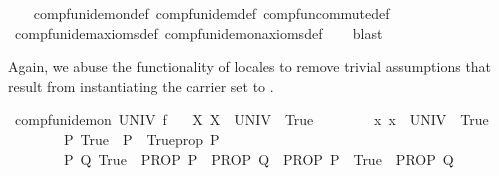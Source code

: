 \begin{isabellebody}
\isadelimproof
\ \ %
\endisadelimproof
%
\isatagproof
{}\isamarkupfalse%
\ comp{\isacharunderscore}{\kern0pt}fun{\isacharunderscore}{\kern0pt}idem{\isacharunderscore}{\kern0pt}on{\isacharunderscore}{\kern0pt}def\ comp{\isacharunderscore}{\kern0pt}fun{\isacharunderscore}{\kern0pt}idem{\isacharunderscore}{\kern0pt}def\ comp{\isacharunderscore}{\kern0pt}fun{\isacharunderscore}{\kern0pt}commute{\isacharunderscore}{\kern0pt}def{\isacharprime}{\kern0pt}\isanewline
\ \ \isamarkupfalse%
\ comp{\isacharunderscore}{\kern0pt}fun{\isacharunderscore}{\kern0pt}idem{\isacharunderscore}{\kern0pt}axioms{\isacharunderscore}{\kern0pt}def\ comp{\isacharunderscore}{\kern0pt}fun{\isacharunderscore}{\kern0pt}idem{\isacharunderscore}{\kern0pt}on{\isacharunderscore}{\kern0pt}axioms{\isacharunderscore}{\kern0pt}def\isanewline
\ \ \isamarkupfalse%
\ blast%
\endisatagproof
{\isafoldproof}%
%
\isadelimproof
%
\endisadelimproof
%
\begin{isamarkuptext}%
Again, we abuse the  functionality of locales to remove trivial assumptions that
  result from instantiating the carrier set to .%
\end{isamarkuptext}\isamarkuptrue%
\isamarkupfalse%
\ comp{\isacharunderscore}{\kern0pt}fun{\isacharunderscore}{\kern0pt}idem{\isacharunderscore}{\kern0pt}on\ UNIV\ f\isanewline
\ \ \ {\isachardoublequoteopen}{\isasymAnd}X{\isachardot}{\kern0pt}\ {\isacharparenleft}{\kern0pt}X\ {\isasymsubseteq}\ UNIV{\isacharparenright}{\kern0pt}\ {\isasymequiv}\ True{\isachardoublequoteclose}\isanewline
\ \ \ \ \ \ \ \ {\isachardoublequoteopen}{\isasymAnd}x{\isachardot}{\kern0pt}\ x\ {\isasymin}\ UNIV\ {\isasymequiv}\ True{\isachardoublequoteclose}\isanewline
\ \ \ \ \ \ \ \ {\isachardoublequoteopen}{\isasymAnd}P{\isachardot}{\kern0pt}\ {\isacharparenleft}{\kern0pt}True\ {\isasymLongrightarrow}\ P{\isacharparenright}{\kern0pt}\ {\isasymequiv}\ Trueprop\ P{\isachardoublequoteclose}\isanewline
\ \ \ \ \ \ \ \ {\isachardoublequoteopen}{\isasymAnd}P\ Q{\isachardot}{\kern0pt}\ {\isacharparenleft}{\kern0pt}True\ {\isasymLongrightarrow}\ PROP\ P\ {\isasymLongrightarrow}\ PROP\ Q{\isacharparenright}{\kern0pt}\ {\isasymequiv}\ {\isacharparenleft}{\kern0pt}PROP\ P\ {\isasymLongrightarrow}\ True\ {\isasymLongrightarrow}\ PROP\ Q{\isacharparenright}{\kern0pt}{\isachardoublequoteclose}\isanewline
%
\isadelimproof
%
\endisadelimproof
%
\isatagproof
{}\isamarkupfalse%
\ {\isacharminus}{\kern0pt}\isanewline

\end{isabellebody}
